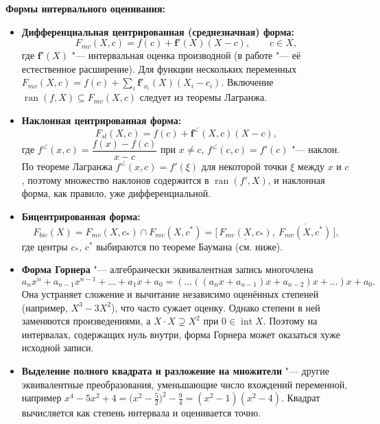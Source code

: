 \documentclass[12pt,a4paper]{article}
\newcommand{\ran}{\operatorname{ran}}
\newcommand{\inter}{\operatorname{int}}
\newcommand{\bff}{\mathbf{f}}
\begin{document}
\textbf{Формы интервального оценивания:}
\begin{itemize}
\item \textbf{Дифференциальная центрированная (среднезначная) форма:}
\[
F_{mv}(X,c)=f(c)+\bff'(X)(X-c),\qquad c\in X,
\]
где $\bff'(X)$ "--- интервальная оценка производной (в работе "--- её естественное расширение). Для функции нескольких переменных $F_{mv}(X,c)=f(c)+\sum_i \bff'_{x_i}(X)(X_i-c_i)$. Включение $\ran(f,X)\subseteq F_{mv}(X,c)$ следует из теоремы Лагранжа.

\item \textbf{Наклонная центрированная форма:}
\[
F_{sl}(X,c)=f(c)+\bff^{\angle}(X,c)(X-c),
\]
где $f^{\angle}(x,c)=\dfrac{f(x)-f(c)}{x-c}$ при $x\neq c$, $f^{\angle}(c,c)=f'(c)$ "--- наклон. По теореме Лагранжа $f^{\angle}(x,c)=f'(\xi)$ для некоторой точки $\xi$ между $x$ и $c$, поэтому множество наклонов содержится в $\ran(f',X)$, и наклонная форма, как правило, уже дифференциальной.

\item \textbf{Бицентрированная форма:}
\[
F_{bic}(X)=F_{mv}(X,c_{*})\cap F_{mv}(X,c^{*})=\bigl[\,\underline{F_{mv}(X,c_{*})},\ \overline{F_{mv}(X,c^{*})}\,\bigr],
\]
где центры $c_{*}$, $c^{*}$ выбираются по теореме Баумана (см. ниже).

\item \textbf{Форма Горнера} "--- алгебраически эквивалентная запись многочлена
\[
a_nx^n+a_{n-1}x^{n-1}+\dots+a_1x+a_0=(\dots((a_nx+a_{n-1})x+a_{n-2})x+\dots)x+a_0.
\]
Она устраняет сложение и вычитание независимо оценённых степеней (например, $X^3-3X^2$), что часто сужает оценку. Однако степени в ней заменяются произведениями, а $X\cdot X\supsetneq X^2$ при $0\in\inter X$. Поэтому на интервалах, содержащих нуль внутри, форма Горнера может оказаться хуже исходной записи.

\item \textbf{Выделение полного квадрата и разложение на множители} "--- другие эквивалентные преобразования, уменьшающие число вхождений переменной, например $x^4-5x^2+4=\bigl(x^2-\tfrac52\bigr)^2-\tfrac94=(x^2-1)(x^2-4)$. Квадрат вычисляется как степень интервала и оценивается точно.
\end{itemize}
\end{document}

